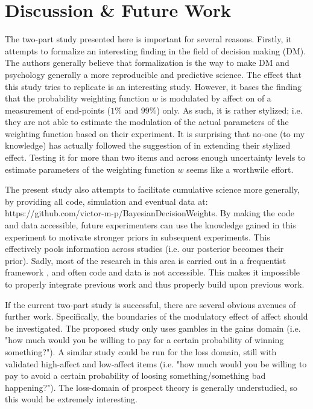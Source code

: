 \documentclass[12pt]{article}
\begin{document}
\section{Discussion \& Future Work}

The two-part study presented here is important
for several reasons. Firstly, it attempts to
formalize an interesting finding in the
field of decision making (DM). The authors generally
believe that formalization is the way to
make DM and psychology generally a more
reproducible and predictive science.
The effect that this study tries to replicate
\autocite{rottenstreich2001money} is an interesting
study. However, it bases the finding that
the probability weighting function $w$ is
modulated by affect on of a measurement of end-points
($1\%$ and $99\%$) only.
As such, it is rather stylized; i.e. they
are not able to estimate the modulation of
the actual parameters of the weighting function
based on their experiment.
It is surprising that no-one (to my knowledge)
has actually followed the suggestion
of \autocite{rottenstreich2001money} in extending
their stylized effect. Testing it for more than
two items and across enough uncertainty
levels to estimate parameters of the weighting
function $w$ seems like a worthwile effort.

\vspace{3mm}
The present study also attempts to facilitate
cumulative science more generally, by providing
all code, simulation and eventual data at:
https://github.com/victor-m-p/BayesianDecisionWeights.
By making the code and data accessible, future
experimenters can use the knowledge gained in
this experiment to motivate stronger priors in
subsequent experiments. This effectively
pools information across studies
(i.e. our posterior becomes their prior). Sadly,
most of the research in this area is carried
out in a frequentist framework
\autocite{gonzalez1999shape, rottenstreich2001money,
hsee2004music}, and often
code and data is not accessible. This makes it
impossible to properly integrate previous work
and thus properly build upon previous work.

\vspace{3mm}
If the current two-part study is successful,
there are several obvious avenues of further
work. Specifically, the boundaries of the modulatory
effect of affect should be investigated. The
proposed study
only uses gambles in the gains domain (i.e. "how
much would you be willing to pay for a
certain probability of winning something?"). A similar
study could be run for the loss domain, still with
validated high-affect and low-affect items (i.e. "how
much would you be willing to pay to avoid a
certain probability of loosing something/something
bad happening?").
The loss-domain of prospect theory is generally
understudied, so this would be extremely interesting.\\
\end{document}
